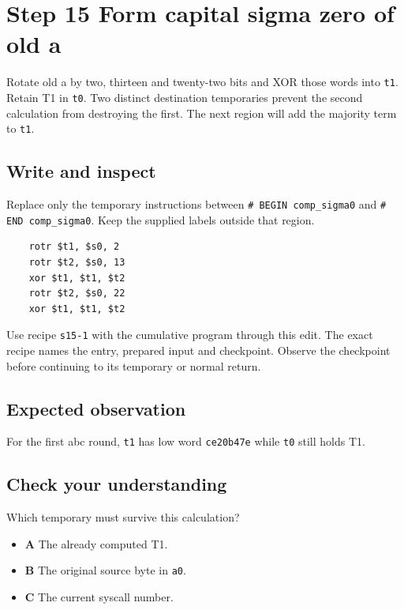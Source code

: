 \section{Step 15 Form capital sigma zero of old a}\label{sha-s15}

Rotate old a by two, thirteen and twenty-two bits and XOR those words into \texttt{t1}. Retain T1 in \texttt{t0}. Two distinct destination temporaries prevent the second calculation from destroying the first. The next region will add the majority term to \texttt{t1}.

\subsection{Write and inspect}
Replace only the temporary instructions between \texttt{\# BEGIN comp\_sigma0} and \texttt{\# END comp\_sigma0}. Keep the supplied labels outside that region.

\begin{verbatim}
    rotr $t1, $s0, 2
    rotr $t2, $s0, 13
    xor $t1, $t1, $t2
    rotr $t2, $s0, 22
    xor $t1, $t1, $t2
\end{verbatim}

Use recipe \texttt{s15-1} with the cumulative program through this edit. The exact recipe names the entry, prepared input and checkpoint. Observe the checkpoint before continuing to its temporary or normal return.

\subsection{Expected observation}
For the first abc round, \texttt{t1} has low word \texttt{ce20b47e} while \texttt{t0} still holds T1.

\subsection{Check your understanding}
Which temporary must survive this calculation?

\begin{itemize}
\item \textbf{A} The already computed T1.
\item \textbf{B} The original source byte in \texttt{a0}.
\item \textbf{C} The current syscall number.
\end{itemize}
